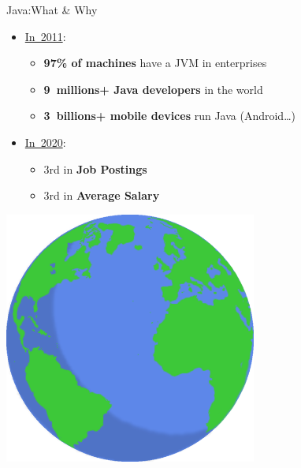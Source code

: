 \documentclass[English,c,%
hyperref={%
    pdftitle={FISA-DE2 OOP in Java},%
    pdfauthor={Muller, Gravier, Laforest, Subercaze},%
    pdfsubject={OOP in Java},%
    pdfkeywords={OOP, Java},%
    colorlinks=true,%
    urlcolor=blue,%
    linkcolor=%
    },%
xcolor={pdftex,svgnames} %
]{beamer}
\begin{document}
\begin{frame}{Java:What \& Why}
  \hspace{3cm}
  \begin{itemize}
    \item \href{https://www.jmdoudoux.fr/java/dej/chap-presentation.htm}{In~2011}:
    \begin{itemize}
      \item \textbf{97\% of machines} have a JVM in enterprises
      \medskip
      \item \textbf{9~millions+ Java developers} in the world
      \medskip
      \item \textbf{3~billions+ mobile devices} run Java (Android\ldots{})
    \end{itemize}
  \end{itemize}
  \medskip
  \begin{itemize}
    \item \href{https://www.codeplatoon.org/best-paying-most-in-demand-programming-languages-2020/}{In~2020}:
    \begin{itemize}
      \item 3rd in \textbf{Job Postings}
      \item 3rd in \textbf{Average Salary}
    \end{itemize}
  \end{itemize}

\bigskip
  \begin{center}
    \includegraphics[height=8.3cm]{images01/earth1.png}
  \end{center}

\end{frame}
\end{document}

